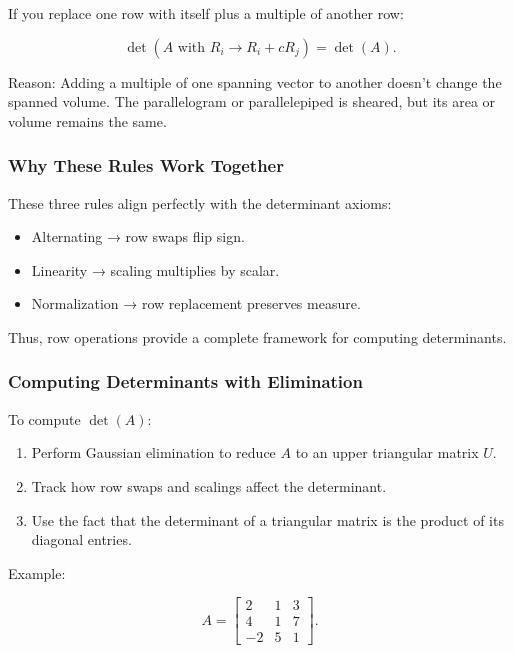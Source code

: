 \documentclass[
  letterpaper,
  DIV=11,
  numbers=noendperiod]{scrreprt}
\providecommand{\tightlist}{%
  \setlength{\itemsep}{0pt}\setlength{\parskip}{0pt}}
\begin{document}
If you replace one row with itself plus a multiple of another row:

\[
\det(A \text{ with } R_i \to R_i + cR_j) = \det(A).
\]

Reason: Adding a multiple of one spanning vector to another doesn't
change the spanned volume. The parallelogram or parallelepiped is
sheared, but its area or volume remains the same.

\subsubsection{Why These Rules Work
Together}\label{why-these-rules-work-together}

These three rules align perfectly with the determinant axioms:

\begin{itemize}
\tightlist
\item
  Alternating → row swaps flip sign.
\item
  Linearity → scaling multiplies by scalar.
\item
  Normalization → row replacement preserves measure.
\end{itemize}

Thus, row operations provide a complete framework for computing
determinants.

\subsubsection{Computing Determinants with
Elimination}\label{computing-determinants-with-elimination}

To compute \(\det(A)\):

\begin{enumerate}
\def\labelenumi{\arabic{enumi}.}
\tightlist
\item
  Perform Gaussian elimination to reduce \(A\) to an upper triangular
  matrix \(U\).
\item
  Track how row swaps and scalings affect the determinant.
\item
  Use the fact that the determinant of a triangular matrix is the
  product of its diagonal entries.
\end{enumerate}

Example:

\[
A = \begin{bmatrix} 2 & 1 & 3 \\ 4 & 1 & 7 \\ -2 & 5 & 1 \end{bmatrix}.
\]
\end{document}

